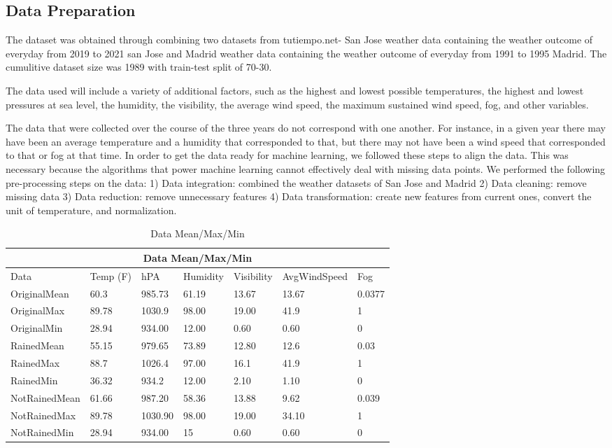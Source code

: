 \documentclass[conference]{IEEEtran}
\begin{document}
\subsection{Data Preparation}
The dataset was obtained through combining two datasets from tutiempo.net- San Jose weather data containing the weather outcome of everyday from 2019 to 2021 san Jose and Madrid weather data containing the weather outcome of everyday from 1991 to 1995 Madrid. The cumulitive dataset size was 1989 with train-test split of 70-30.


The data used will include a variety of additional factors, such as the highest and lowest possible temperatures, the highest and lowest pressures at sea level, the humidity, the visibility, the average wind speed, the maximum sustained wind speed, fog, and other variables.


The data that were collected over the course of the three years do not correspond with one another. For instance, in a given year there may have been an average temperature and a humidity that corresponded to that, but there may not have been a wind speed that corresponded to that or fog at that time. In order to get the data ready for machine learning, we followed these steps to align the data. This was necessary because the algorithms that power machine learning cannot effectively deal with missing data points.
We performed the following pre-processing steps on the data: 
1) Data integration: combined the weather datasets of San Jose and Madrid 
2) Data cleaning: remove missing data 
3) Data reduction: remove unnecessary features 
4) Data transformation: create new features from current ones, convert the unit of temperature, and normalization.

\begin{table}
\begin{tabular}{ |p{2cm}||p{2cm}|p{2cm}|p{2cm}|p{2cm}| p{2cm}|p{2cm}| }
 \hline
 \multicolumn{7}{|c|}{Data Mean/Max/Min}\\
  \hline
 Data & Temp (F) & hPA & Humidity & Visibility & AvgWindSpeed & Fog\\
 \hline

OriginalMean & 60.3 & 985.73 &61.19&13.67&13.67&0.0377
\\
OriginalMax & 89.78 & 1030.9 & 98.00 & 19.00 & 41.9 & 1
\\
OriginalMin & 28.94 & 934.00 & 12.00 & 0.60 & 0.60 & 0
\\
RainedMean & 55.15 & 979.65 &73.89&12.80&12.6&0.03
\\
RainedMax & 88.7 & 1026.4 & 97.00 & 16.1 & 41.9 & 1
\\
RainedMin & 36.32 & 934.2 & 12.00 & 2.10 & 1.10 & 0
\\
NotRainedMean & 61.66 & 987.20 & 58.36 & 13.88 & 9.62 & 0.039
\\
NotRainedMax & 89.78 & 1030.90 & 98.00 & 19.00 & 34.10 & 1
\\
NotRainedMin & 28.94 & 934.00 & 15 & 0.60 & 0.60 & 0
\\
\hline

\end{tabular}
\caption{Data Mean/Max/Min}
\label{MMM}
\end{table}
\end{document}
